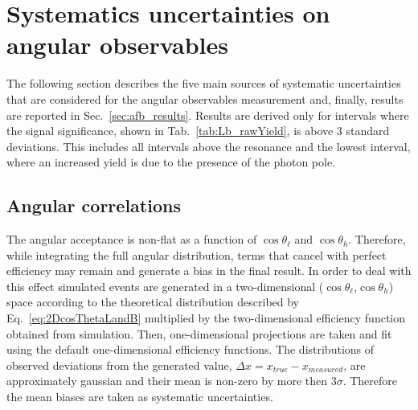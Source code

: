 \section{Systematics uncertainties on angular observables}
\label{sec:ang_results}

The following section describes the five main sources of systematic uncertainties
that are considered for the angular observables measurement and, finally, results are
reported in Sec.~\ref{sec:afb_results}. Results are derived only for \qsq intervals
where the signal significance, shown in Tab.~\ref{tab:Lb_rawYield}, is above 3 standard
deviations. This includes all \qsq intervals above the \jpsi resonance and the lowest 
\qsq interval, where an increased yield is due to the presence of the photon pole.



\subsection{Angular correlations}

The angular acceptance is non-flat as a function of $\cos\theta_\ell$ and $\cos \theta_h$.
Therefore, while integrating the full angular distribution, terms that cancel with perfect efficiency
may remain and generate a bias in the final result. In order to deal with this effect simulated events are
generated in a two-dimensional ($\cos\theta_\ell$,$\cos \theta_h$) space according to the
theoretical distribution described by Eq.~\ref{eq:2DcosThetaLandB} multiplied by the two-dimensional
efficiency function obtained from simulation. %
Then, one-dimensional projections are taken and fit using the default one-dimensional efficiency functions.
The distributions of observed deviations from the generated value, $\Delta x = x_{true} - x_{measured}$,
are approximately gaussian and their mean is non-zero by more then 3$\sigma$.
Therefore the mean biases are taken as systematic uncertainties.
%
%




